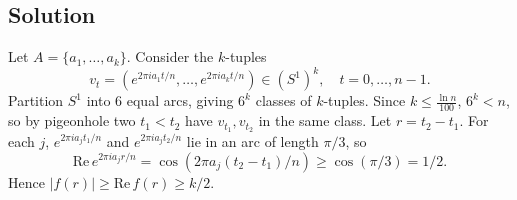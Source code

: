 \documentclass{article}
\begin{document}
\subsection*{Solution}
Let $A=\{a_1,\dots,a_k\}$. Consider the $k$-tuples
\[v_t = (e^{2\pi i a_1 t/n},\dots, e^{2\pi i a_k t/n}) \in (S^1)^k,\quad t=0,\dots,n-1.\]
Partition $S^1$ into 6 equal arcs, giving $6^k$ classes of $k$-tuples. Since $k\le \frac{\ln n}{100}$, $6^k < n$, so by pigeonhole two $t_1<t_2$ have $v_{t_1}, v_{t_2}$ in the same class. Let $r=t_2-t_1$. For each $j$, $e^{2\pi i a_j t_1/n}$ and $e^{2\pi i a_j t_2/n}$ lie in an arc of length $\pi/3$, so
\[\mathrm{Re}\,e^{2\pi i a_j r/n} = \cos(2\pi a_j(t_2-t_1)/n) \ge \cos(\pi/3) = 1/2.\]
Hence $|f(r)|\ge \mathrm{Re}\,f(r)\ge k/2$.
\end{document}
